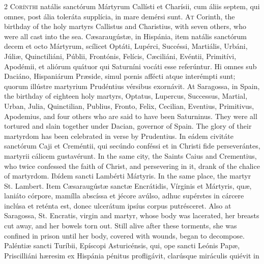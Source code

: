 \begin{paracol}{2}
\lettrine[lines=2]{C}{orínthi} natális 
 sanctórum Mártyrum Callísti et Charísii, cum áliis septem, qui omnes, post 
 ália toleráta supplícia, in mare demérsi sunt.
\switchcolumn
{}
\lettrine[lines=2]{A}{t} Corinth, the birthday of the 
 holy martyrs Callistus and Charistius, with seven others, who were all cast 
 into the sea.
\switchcolumn*
{}
Cæsaraugústæ, in 
 Hispánia, item natális sanctórum decem et octo Mártyrum, scílicet Optáti, 
 Lupérci, Succéssi, Martiális, Urbáni, Júliæ, Quinctiliáni, Públii, Frontónis, 
 Felícis, Cæciliáni, Evéntii, Primitívi, Apodémii, et aliórum quátuor qui 
 Saturníni vocáti esse referúntur. Hi omnes sub Daciáno, Hispaniárum 
 Præside, simul pœnis affécti atque interémpti sunt; quorum illústre 
 martyrium Prudéntius vérsibus exornávit.
\switchcolumn
{}
At Saragossa, in Spain, the 
 birthday of eighteen holy martyrs, Optatus, Lupercus, Successus, Martial, 
 Urban, Julia, Quinctilian, Publius, Fronto, Felix, Cecilian, Eventius, 
 Primitivus, Apodemius, and four others who are said to have been Saturninus. 
 They were all tortured and slain together under Dacian, governor of Spain. 
 The glory of their martyrdom has been celebrated in verse by Prudentius.
\switchcolumn*
{}
In eádem civitáte 
 sanctórum Caji et Creméntii, qui secúndo conféssi et in Christi fide 
 perseverántes, martyrii cálicem gustavérunt.
\switchcolumn
{}
In the same city, the Saints Caius 
 and Crementius, who twice confessed the faith of Christ, and persevering in 
 it, drank of the chalice of martyrdom.
\switchcolumn*
{}
Ibídem sancti Lambérti 
 Mártyris.
\switchcolumn
{}
In the same place, the martyr St. 
 Lambert.
\switchcolumn*
{}
Item Cæsaraugústæ 
 sanctæ Encrátidis, Vírginis et Mártyris, quæ, laniáto córpore, mamílla 
 abscíssa et jécore avúlso, adhuc supérstes in cárcere inclúsa et reténta est, 
 donec ulcerátum ipsíus corpus putrésceret.
\switchcolumn
{}
Also at Saragossa, St. Encratis, 
 virgin and martyr, whose body was lacerated, her breasts cut away, and her 
 bowels torn out. Still alive after these torments, she was confined in 
 prison until her body, covered with wounds, began to decompose.
\switchcolumn*
{}
Paléntiæ sancti 
 Turíbii, Epíscopi Asturicénsis, qui, ope sancti Leónis Papæ, Priscilliáni 
 hæresim ex Hispánia pénitus profligávit, clarúsque miráculis quiévit in 

\end{paracol}
